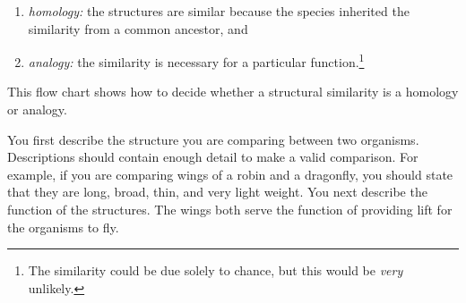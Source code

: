 \documentclass[12pt, hidelinks]{exam}
\begin{document}
\begin{enumerate}
	\item \emph{homology:} the structures are similar because the species
inherited the similarity from a common ancestor, and

	\item \emph{analogy:} the similarity is necessary for a particular function.\footnote{The similarity
could be due solely to chance, but this would be \emph{very}
unlikely.} 
\end{enumerate}

\bigskip

This flow chart shows how to decide whether a structural similarity 
is a homology or analogy. 

\begin{center}


\end{center}

\bigskip

You first describe the structure you are comparing
between two organisms. Descriptions should contain enough detail to make
a valid comparison. For example, if you are comparing wings of a robin and a 
dragonfly, you should state that they are long, broad, thin, and very light weight.
You next describe the function of the structures. The wings both serve the
function of providing lift for the organisms to fly. 
\end{document}
